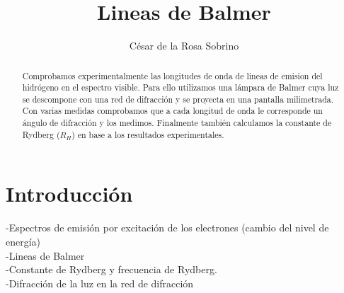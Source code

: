 \documentclass{article}
\title{Lineas de Balmer}
\author{César de la Rosa Sobrino}
\begin{document}
\maketitle

\renewcommand{\abstractname}{Resumen}
 
\begin{abstract}
Comprobamos experimentalmente las longitudes de onda de lineas de emision del hidrógeno en el espectro visible. Para ello utilizamos una lámpara de Balmer cuya luz se descompone con una red de difracción y se proyecta en una pantalla milimetrada. Con varias medidas comprobamos que a cada longitud de onda le corresponde un ángulo de difracción y los medimos. Finalmente también calculamos la constante de Rydberg ($R_H$) en base a los resultados experimentales.
\end{abstract}

\section{Introducción}
-Espectros de emisión por excitación de los electrones (cambio del nivel de energía) \\
-Lineas de Balmer\\
-Constante de Rydberg y frecuencia de Rydberg.\\
-Difracción de la luz en la red de difracción\\
\end{document}
